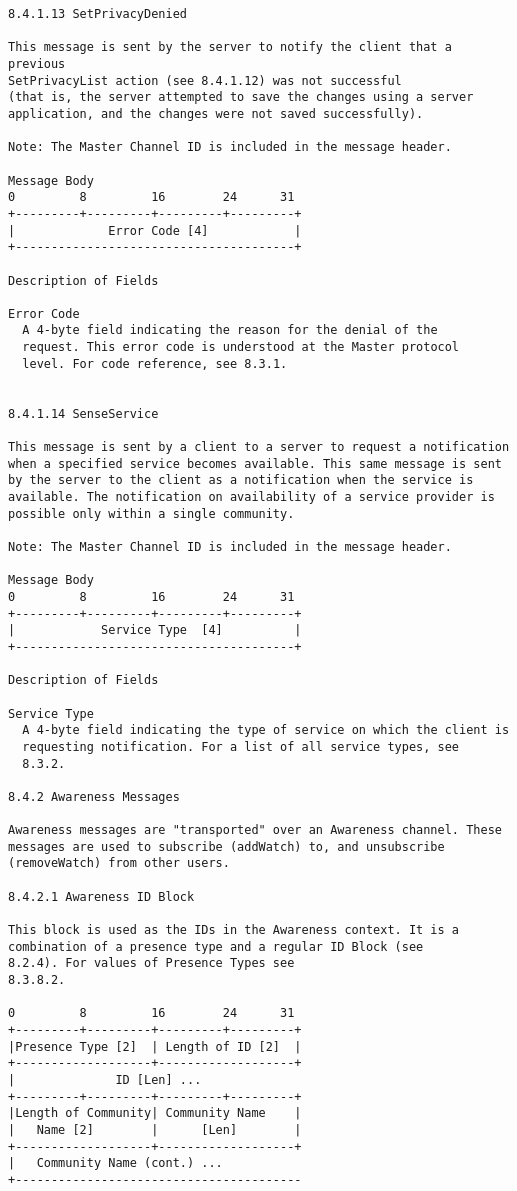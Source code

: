 \documentclass[titlepage,oneside]{book}
\begin{document}
\begin{verbatim}
8.4.1.13 SetPrivacyDenied

This message is sent by the server to notify the client that a previous
SetPrivacyList action (see 8.4.1.12) was not successful
(that is, the server attempted to save the changes using a server
application, and the changes were not saved successfully).

Note: The Master Channel ID is included in the message header.

Message Body
0         8         16        24      31
+---------+---------+---------+---------+
|             Error Code [4]            |
+---------------------------------------+

Description of Fields

Error Code
  A 4-byte field indicating the reason for the denial of the
  request. This error code is understood at the Master protocol
  level. For code reference, see 8.3.1.


8.4.1.14 SenseService

This message is sent by a client to a server to request a notification
when a specified service becomes available. This same message is sent
by the server to the client as a notification when the service is
available. The notification on availability of a service provider is
possible only within a single community.

Note: The Master Channel ID is included in the message header.

Message Body
0         8         16        24      31
+---------+---------+---------+---------+
|            Service Type  [4]          |
+---------------------------------------+

Description of Fields

Service Type
  A 4-byte field indicating the type of service on which the client is 
  requesting notification. For a list of all service types, see 
  8.3.2.

8.4.2 Awareness Messages

Awareness messages are "transported" over an Awareness channel. These
messages are used to subscribe (addWatch) to, and unsubscribe
(removeWatch) from other users.

8.4.2.1 Awareness ID Block

This block is used as the IDs in the Awareness context. It is a 
combination of a presence type and a regular ID Block (see 
8.2.4). For values of Presence Types see 
8.3.8.2.

0         8         16        24      31
+---------+---------+---------+---------+
|Presence Type [2]  | Length of ID [2]  |
+-------------------+-------------------+
|              ID [Len] ...
+---------+---------+---------+---------+
|Length of Community| Community Name    |
|   Name [2]        |      [Len]        |
+-------------------+-------------------+
|   Community Name (cont.) ...
+----------------------------------------


\end{verbatim}
\end{document}
